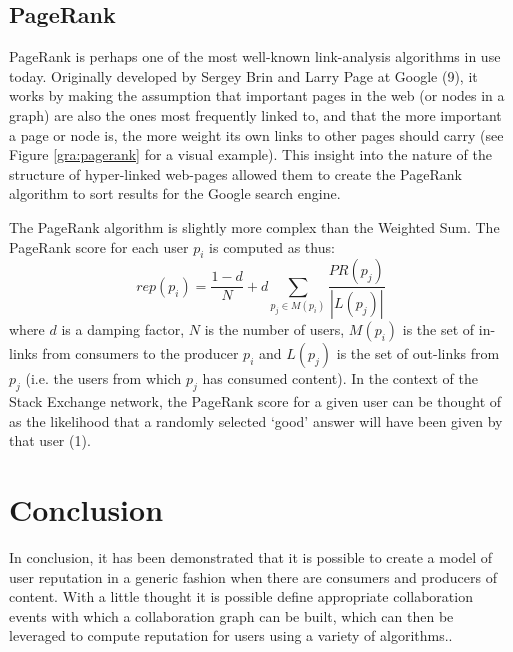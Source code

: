 \documentclass[]{final_report}
\begin{document}
\subsection{PageRank}

PageRank is perhaps one of the most well-known link-analysis algorithms in use today. Originally developed by Sergey Brin and Larry Page at Google (9), it works by making the assumption that important pages in the web (or nodes in a graph) are also the ones most frequently linked to, and that the more important a page or node is, the more weight its own links to other pages should carry (see Figure \ref{gra:pagerank} for a visual example). This insight into the nature of the structure of hyper-linked web-pages allowed them to create the PageRank algorithm to sort results for the Google search engine.

The PageRank algorithm is slightly more complex than the Weighted Sum. The PageRank score for each user $p_{i}$ is computed as thus:
\[
rep(p_{i}) = \frac{1 - d}{N} + d \sum_{p_{j} \in M(p_{i})} \frac{PR(p_{j})}{|L(p_{j})|}
\]
where $d$ is a damping factor, $N$ is the number of users, $M(p_{i})$ is the set of in-links from consumers to the producer $p_{i}$ and $L(p_{j})$ is the set of out-links from $p_{j}$ (i.e. the users from which $p_{j}$ has consumed content). In the context of the Stack Exchange network, the PageRank score for a given user can be thought of as the likelihood that a randomly selected `good' answer will have been given by that user (1).



\section{Conclusion}

In conclusion, it has been demonstrated that it is possible to create a model of user reputation in a generic fashion when there are consumers and producers of content. With a little thought it is possible define appropriate collaboration events with which a collaboration graph can be built, which can then be leveraged to compute reputation for users using a variety of algorithms.. 
\end{document}

